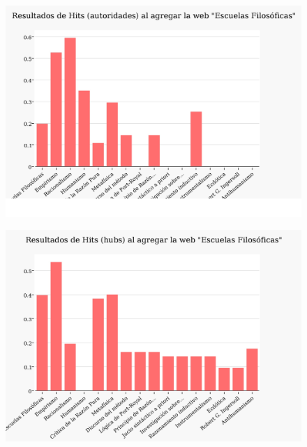\documentclass[a4paper]{article}
\begin{document}
\begin{figure}[h!]
  \begin{center}
	\includegraphics[scale=0.3]{imagenes/Exp2/hitsa2nuevo}
	\caption{}
	\label{pr2}
  \end{center}
\end{figure}
\newpage
\begin{figure}
 \begin{center}
	\includegraphics[scale=0.3]{imagenes/Exp2/hitsH2}
	\caption{}
	\label{hitsh2}
  \end{center}
\end{figure}
\end{document}
